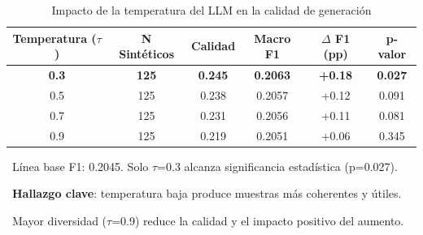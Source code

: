 \begin{table}[htbp]
\centering
\caption{Impacto de la temperatura del LLM en la calidad de generación}
\label{tab:temperature_validation}
\begin{tabular}{cccccc}
\toprule
\textbf{Temperatura ($\tau$)} & \textbf{N Sintéticos} & \textbf{Calidad} & \textbf{Macro F1} & \textbf{$\Delta$ F1 (pp)} & \textbf{p-valor} \\
\midrule
\rowcolor{green!20}
\textbf{0.3} & \textbf{125} & \textbf{0.245} & \textbf{0.2063} & \textbf{+0.18} & \textbf{0.027} \\
0.5 & 125 & 0.238 & 0.2057 & +0.12 & 0.091 \\
0.7 & 125 & 0.231 & 0.2056 & +0.11 & 0.081 \\
0.9 & 125 & 0.219 & 0.2051 & +0.06 & 0.345 \\
\bottomrule
\end{tabular}
\vspace{0.5em}\footnotesize

\textbullet\ Línea base F1: 0.2045. Solo $\tau$=0.3 alcanza significancia estadística (p=0.027).

\textbullet\ \textbf{Hallazgo clave}: temperatura baja produce muestras más coherentes y útiles.

\textbullet\ Mayor diversidad ($\tau$=0.9) reduce la calidad y el impacto positivo del aumento.

\end{table}
